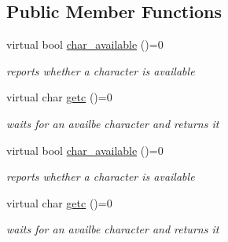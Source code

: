 \subsection*{Public Member Functions}
\begin{DoxyCompactItemize}
\item 
virtual bool \hyperlink{classhwlib_1_1istream_ad412c296e0068a518677af8cd4850e63}{char\+\_\+available} ()=0\hypertarget{classhwlib_1_1istream_ad412c296e0068a518677af8cd4850e63}{}\label{classhwlib_1_1istream_ad412c296e0068a518677af8cd4850e63}

\begin{DoxyCompactList}\small\item\em reports whether a character is available \end{DoxyCompactList}\item 
virtual char \hyperlink{classhwlib_1_1istream_a9a260f800b08d4788b9e399f65d1c728}{getc} ()=0\hypertarget{classhwlib_1_1istream_a9a260f800b08d4788b9e399f65d1c728}{}\label{classhwlib_1_1istream_a9a260f800b08d4788b9e399f65d1c728}

\begin{DoxyCompactList}\small\item\em waits for an availbe character and returns it \end{DoxyCompactList}\item 
virtual bool \hyperlink{classhwlib_1_1istream_ad412c296e0068a518677af8cd4850e63}{char\+\_\+available} ()=0\hypertarget{classhwlib_1_1istream_ad412c296e0068a518677af8cd4850e63}{}\label{classhwlib_1_1istream_ad412c296e0068a518677af8cd4850e63}

\begin{DoxyCompactList}\small\item\em reports whether a character is available \end{DoxyCompactList}\item 
virtual char \hyperlink{classhwlib_1_1istream_a9a260f800b08d4788b9e399f65d1c728}{getc} ()=0\hypertarget{classhwlib_1_1istream_a9a260f800b08d4788b9e399f65d1c728}{}\label{classhwlib_1_1istream_a9a260f800b08d4788b9e399f65d1c728}

\begin{DoxyCompactList}\small\item\em waits for an availbe character and returns it \end{DoxyCompactList}\end{DoxyCompactItemize}
